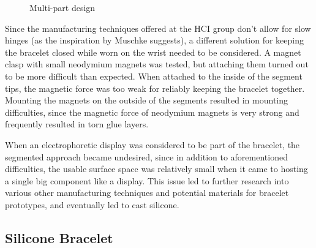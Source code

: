 \begin{figure}[bth]
	\myfloatalign
	 \quad
	\caption{Multi-part design}
\end{figure}

Since the manufacturing techniques offered at the \ac{HCI} group don't allow for slow hinges (as the inspiration by Muschke suggests), a different solution for keeping the bracelet closed while worn on the wrist needed to be considered. A magnet clasp with small neodymium magnets was tested, but attaching them turned out to be more difficult than expected. When attached to the inside of the segment tips, the magnetic force was too weak for reliably keeping the bracelet together. Mounting the magnets on the outside of the segments resulted in mounting difficulties, since the magnetic force of neodymium magnets is very strong and frequently resulted in torn glue layers.

When an electrophoretic display was considered to be part of the bracelet, the segmented approach became undesired, since in addition to aforementioned difficulties, the usable surface space was relatively small when it came to hosting a single big component like a display. This issue led to further research into various other manufacturing techniques and potential materials for bracelet prototypes, and eventually led to cast silicone.

\subsection{Silicone Bracelet}

